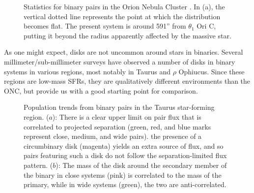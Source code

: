 


\begin{figure}[h]
  \hspace*{\fill}%
  \hspace*{\fill}%
  \caption{Statistics for binary pairs in the Orion Nebula Cluster \citep{Reipurth2007}. In (a), the vertical dotted line represents the point at which the distribution becomes flat. The present system is around 591'' from $\theta_1$ Ori C, putting it beyond the radius apparently affected by the massive star.}
  \label{fig:onc_binary_stats}
\end{figure}




As one might expect, disks are not uncommon around stars in binaries. Several millimeter/sub-millimeter surveys have observed a number of disks in binary systems in various regions, most notably in Taurus and $\rho$ Ophiucus. Since these regions are low-mass SFRs, they are qualitatively different environments than the ONC, but provide us with a good starting point for comparison.



\begin{figure}[h!]
  \caption{Population trends from binary pairs in the Taurus star-forming region. ($a$): There is a clear upper limit on pair flux that is correlated to projected separation (green, red, and blue marks represent close, medium, and wide pairs). the presence of a circumbinary disk (magenta) yields an extra source of flux, and so pairs featuring such a disk do not follow the separation-limited flux pattern. ($b$): The mass of the disk around the secondary member of the binary in close systems (pink) is correlated to the mass of the primary, while in wide systems (green), the two are anti-correlated.}
  \label{fig:taurus_binaries}
\end{figure}

